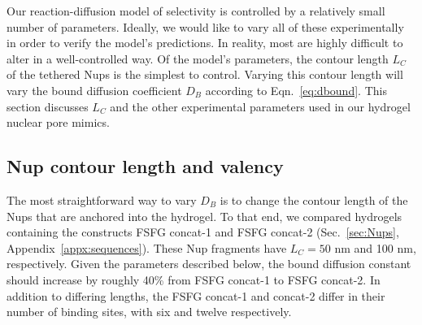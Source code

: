Our reaction-diffusion model of selectivity is controlled by a relatively small number of parameters.  Ideally, we would like to vary all of these experimentally in order to verify the model's predictions.  In reality, most are highly difficult to alter in a well-controlled way.  Of the model's parameters, the contour length $L_C$ of the tethered Nups is the simplest to control.  Varying this contour length will vary the bound diffusion coefficient $D_B$ according to Eqn.~\ref{eq:dbound}.  This section discusses $L_C$ and the other experimental parameters used in our hydrogel nuclear pore mimics.

\subsection{Nup contour length and valency}

The most straightforward way to vary $D_B$ is to change the contour length of the Nups that are anchored into the hydrogel.  To that end, we compared hydrogels containing the constructs FSFG concat-1 and FSFG concat-2 (Sec.~\ref{sec:Nups}, Appendix~\ref{appx:sequences}).  These Nup fragments have $L_C = 50$ nm and 100 nm, respectively.  Given the parameters described below, the bound diffusion constant should increase by roughly 40\% from FSFG concat-1 to FSFG concat-2.  In addition to differing lengths, the FSFG concat-1 and concat-2 differ in their number of binding sites, with six and twelve respectively.  %


